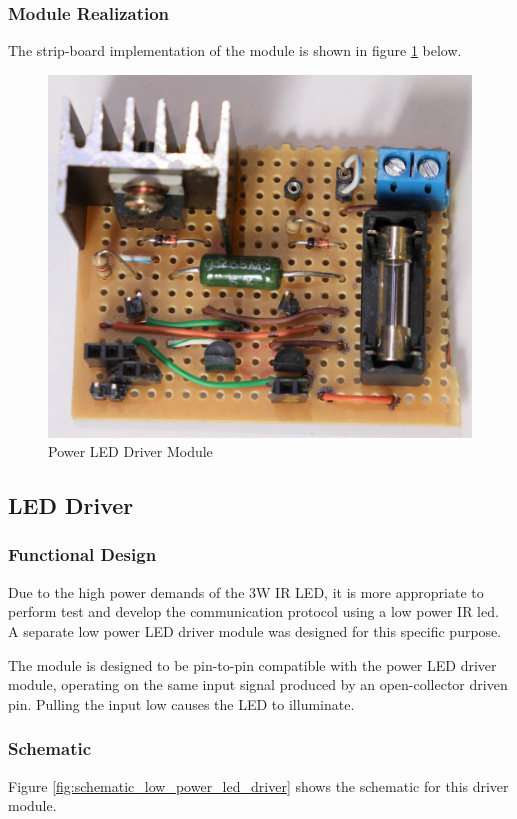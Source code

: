 

\subsubsection{Module Realization}
The strip-board implementation of the module is shown in figure \ref{fig:module_power_led_driver} below.

\begin{figure}[H]
	\centering
	\includegraphics[width=.6\textwidth]{figures/modules/power_led_driver.jpg}
	\caption{Power LED Driver Module}
	\label{fig:module_power_led_driver}
\end{figure}







\subsection{LED Driver}

\subsubsection{Functional Design}
Due to the high power demands of the 3W IR LED, it is more appropriate to perform test and develop the communication protocol using a low power IR led. A separate low power LED driver module was designed for this specific purpose.

The module is designed to be pin-to-pin compatible with the power LED driver module, operating on the same input signal produced by an open-collector driven pin. Pulling the input low causes the LED to illuminate.



\subsubsection{Schematic}
Figure \ref{fig:schematic_low_power_led_driver} shows the schematic for this driver module.

